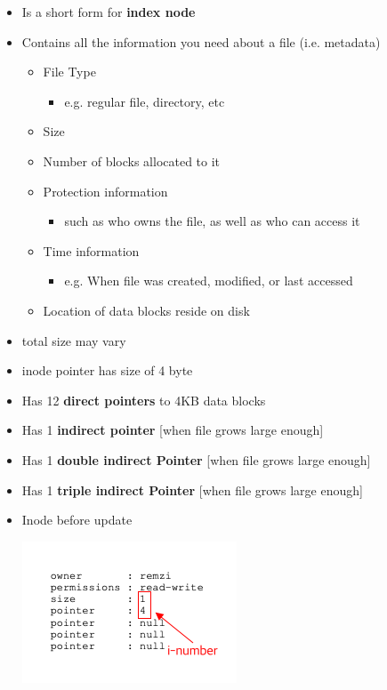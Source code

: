\documentclass[12pt]{article}
\begin{document}
\begin{itemize}
    \item Is a short form for \textbf{index node}
    \item Contains all the information you need about a file (i.e. metadata)

    \begin{itemize}
        \item File Type
        \begin{itemize}
            \item e.g. regular file, directory, etc
        \end{itemize}
        \item Size
        \item Number of blocks allocated to it
        \item Protection information
        \begin{itemize}
            \item such as who owns the file, as well as who can access it
        \end{itemize}
        \item Time information
        \begin{itemize}
            \item e.g. When file was created, modified, or last accessed
        \end{itemize}
        \item Location of data blocks reside on disk
    \end{itemize}

    \item total size may vary
    \item inode pointer has size of 4 byte
    \item Has 12 \textbf{direct pointers} to 4KB data blocks
    \item Has 1 \textbf{indirect pointer} [when file grows large enough]
    \item Has 1 \textbf{double indirect Pointer} [when file grows large enough]
    \item Has 1 \textbf{triple indirect Pointer} [when file grows large enough]

    \item Inode before update

    \begin{center}
    \includegraphics[width=0.6\linewidth]{../images/midterm_4_solution_26.png}
    \end{center}


\end{itemize}
\end{document}
